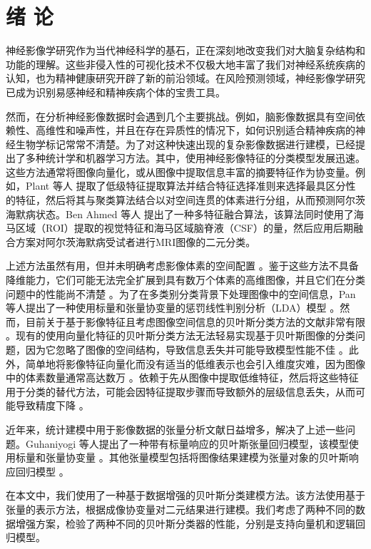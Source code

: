 \documentclass[AutoFakeBold]{LZUThesis}
\newcommand{\scite}[1]{\textsuperscript{\cite{#1}}}
\begin{document}

\mainmatter
\chapter{\texorpdfstring{绪 \quad 论}{绪论}}

神经影像学研究作为当代神经科学的基石，正在深刻地改变我们对大脑复杂结构和功能的理解。这些非侵入性的可视化技术不仅极大地丰富了我们对神经系统疾病的认知，也为精神健康研究开辟了新的前沿领域。在风险预测领域，神经影像学研究已成为识别易感神经和精神疾病个体的宝贵工具。

然而，在分析神经影像数据时会遇到几个主要挑战。例如，脑影像数据具有空间依赖性、高维性和噪声性，并且在存在异质性的情况下，如何识别适合精神疾病的神经生物学标记常常不清楚。为了对这种快速出现的复杂影像数据进行建模，已经提出了多种统计学和机器学习方法。其中，使用神经影像特征的分类模型发展迅速。这些方法通常将图像向量化，或从图像中提取信息丰富的摘要特征作为协变量。例如，Plant 等人\scite{plant2010automated} 提取了低级特征提取算法并结合特征选择准则来选择最具区分性的特征，然后将其与聚类算法结合以对空间连贯的体素进行分组，从而预测阿尔茨海默病状态。Ben Ahmed 等人\scite{ben2015classification} 提出了一种多特征融合算法，该算法同时使用了海马区域（ROI）提取的视觉特征和海马区域脑脊液（CSF）的量，然后应用后期融合方案对阿尔茨海默病受试者进行MRI图像的二元分类。

上述方法虽然有用，但并未明确考虑影像体素的空间配置 。鉴于这些方法不具备降维能力，它们可能无法完全扩展到具有数万个体素的高维图像，并且它们在分类问题中的性能尚不清楚 。为了在多类别分类背景下处理图像中的空间信息，Pan 等人\scite{pan2019covariate}提出了一种使用标量和张量协变量的惩罚线性判别分析（LDA）模型 。然而，目前关于基于影像特征且考虑图像空间信息的贝叶斯分类方法的文献非常有限 。现有的使用向量化特征的贝叶斯分类方法无法轻易实现基于贝叶斯图像的分类问题，因为它忽略了图像的空间结构，导致信息丢失并可能导致模型性能不佳 。此外，简单地将影像特征向量化而没有适当的低维表示也会引入维度灾难，因为图像中的体素数量通常高达数万 。依赖于先从图像中提取低维特征，然后将这些特征用于分类的替代方法，可能会因特征提取步骤而导致额外的层级信息丢失，从而可能导致精度下降 。

近年来，统计建模中用于影像数据的张量分析文献日益增多，解决了上述一些问题。Guhaniyogi 等人\scite{guhaniyogi2017bayesian}提出了一种带有标量响应的贝叶斯张量回归模型，该模型使用标量和张量协变量 。其他张量模型包括将图像结果建模为张量对象的贝叶斯响应回归模型 。

在本文中，我们使用了一种基于数据增强的贝叶斯分类建模方法。该方法使用基于张量的表示方法，根据成像协变量对二元结果进行建模。我们考虑了两种不同的数据增强方案，检验了两种不同的贝叶斯分类器的性能，分别是支持向量机和逻辑回归模型。
\end{document}
